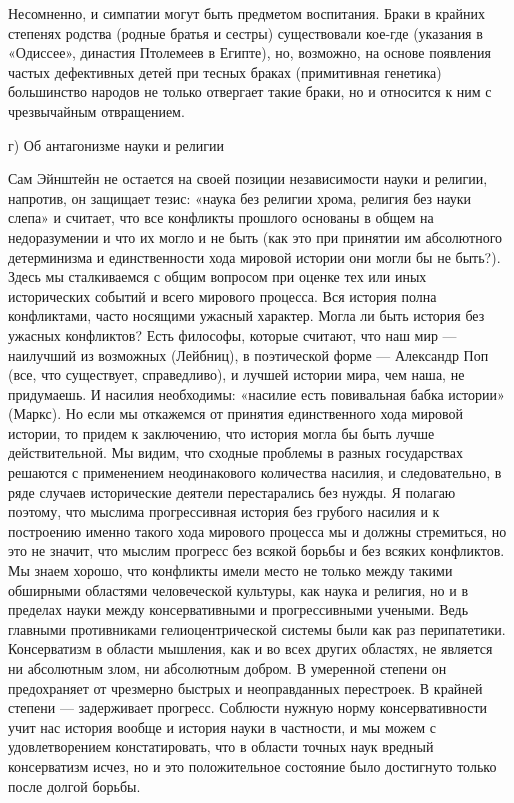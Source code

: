 Несомненно,  и  симпатии  могут  быть предметом  воспитания.  Браки  в
крайних степенях родства (родные братья и сестры) существовали кое-где
(указания  в «Одиссее»,  династия Птолемеев  в Египте),  но, возможно,
на  основе  появления  частых  дефективных  детей  при  тесных  браках
(примитивная генетика)  большинство народов не только  отвергает такие
браки, но и относится к ним с чрезвычайным отвращением.

г) Об антагонизме науки и религии

Сам  Эйнштейн  не остается  на  своей  позиции независимости  науки  и
религии,  напротив,  он  защищает  тезис: «наука  без  религии  хрома,
религия  без  науки  слепа»  и считает,  что  все  конфликты  прошлого
основаны в общем  на недоразумении и что  их могло и не  быть (как это
при принятии им абсолютного детерминизма и единственности хода мировой
истории  они  могли  бы  не  быть?). Здесь  мы  сталкиваемся  с  общим
вопросом  при  оценке  тех  или  иных  исторических  событий  и  всего
мирового  процесса.  Вся  история полна  конфликтами,  часто  носящими
ужасный  характер.  Могла  ли  быть история  без  ужасных  конфликтов?
Есть  философы,  которые  считают,  что   наш  мир  ---  наилучший  из
возможных  (Лейбниц),  в поэтической  форме  ---  Александр Поп  (все,
что  существует, справедливо),  и лучшей  истории мира,  чем наша,  не
придумаешь.  И насилия  необходимы:  «насилие  есть повивальная  бабка
истории» (Маркс). Но если мы  откажемся от принятия единственного хода
мировой  истории,  то  придем  к  заключению,  что  история  могла  бы
быть лучше  действительной. Мы  видим, что  сходные проблемы  в разных
государствах решаются с  применением неодинакового количества насилия,
и  следовательно, в  ряде случаев  исторические деятели  перестарались
без  нужды.  Я  полагаю  поэтому, что  мыслима  прогрессивная  история
без  грубого  насилия  и  к построению  именно  такого  хода  мирового
процесса  мы  и  должны  стремиться,  но это  не  значит,  что  мыслим
прогресс  без  всякой  борьбы  и   без  всяких  конфликтов.  Мы  знаем
хорошо, что  конфликты имели  место не  только между  такими обширными
областями человеческой культуры, как наука  и религия, но и в пределах
науки между  консервативными и  прогрессивными учеными.  Ведь главными
противниками  гелиоцентрической  системы  были как  раз  перипатетики.
Консерватизм в  области мышления,  как и во  всех других  областях, не
является ни абсолютным злом, ни абсолютным добром. В умеренной степени
он  предохраняет от  чрезмерно быстрых  и неоправданных  перестроек. В
крайней  степени  ---  задерживает  прогресс.  Соблюсти  нужную  норму
консервативности учит нас история вообще  и история науки в частности,
и мы можем с удовлетворением констатировать, что в области точных наук
вредный  консерватизм исчез,  но  и это  положительное состояние  было
достигнуто только после долгой борьбы.

